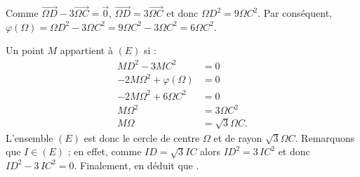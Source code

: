 \begin{description}
\begin{description}
\begin{enumerate}
\begin{enumerate}
                                 Comme $\overrightarrow{\Omega D} - 3 \overrightarrow{\Omega C} = \vec{0}$, 
                                 $\overrightarrow{\Omega D} = 3 \overrightarrow{\Omega C}$ et donc 
                                 $\Omega D^2 = 9 \Omega C^2$.
                                 Par cons\'equent, 
                                 $\varphi(\Omega)=\Omega D^2-3\Omega C^2=9\Omega C^2-3\Omega C^2=6\Omega C^2$.

                                 Un point $M$ appartient \`a $(E)$ si : 
                                 \begin{align*}
                                    MD^2 - 3 MC^2 & = 0 \\
                                    -2 M\Omega^2 + \varphi (\Omega) & = 0 \\
                                    -2 M\Omega^2 + 6 \Omega C^2 & = 0 \\
                                    M\Omega^2 & = 3 \Omega C^2 \\
                                    M\Omega & = \sqrt{3} \Omega C .
                                 \end{align*}
                                 L'ensemble $(E)$ est donc le 
                                 cercle de centre $\Omega$ et de rayon $\sqrt{3} \Omega C$.
                                 Remarquons que $I \in (E)$ ; 
                                 en effet, comme $ID = \sqrt{3} IC$ alors $ID^2 = 3\, IC^2$ et donc 
                                 $ID^2 - 3 \, IC^2 = 0$.
                                 Finalement, en d\'eduit que 
                                 .
                                 

\end{enumerate}
\end{enumerate}
\end{description}
\end{description}
